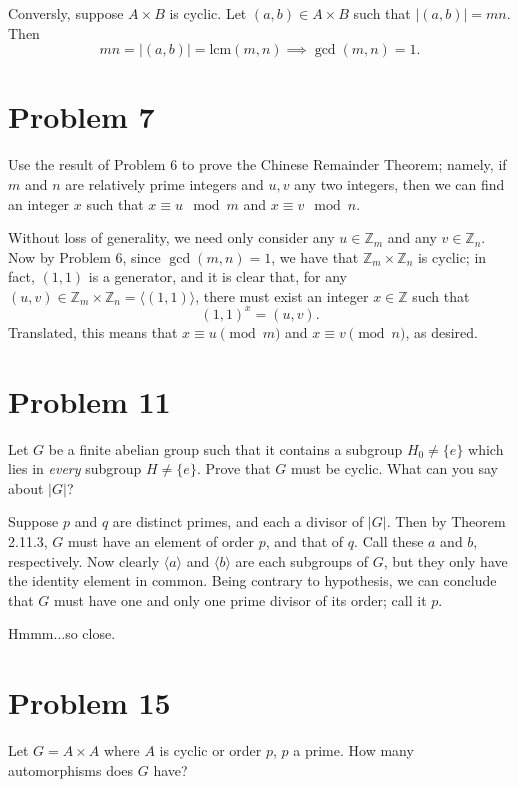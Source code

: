 \documentclass[12pt]{article}
\newcommand{\lcm}{\mbox{lcm}}
\newcommand{\Z}{\mathbb{Z}}
\begin{document}
Conversly, suppose $A\times B$ is cyclic.  Let $(a,b)\in A\times B$ such that $|(a,b)|=mn$.
Then
\begin{equation*}
mn=|(a,b)|=\lcm(m,n)\implies\gcd(m,n)=1.
\end{equation*}

\section*{Problem 7}

Use the result of Problem 6 to prove the Chinese Remainder Theorem; namely, if $m$ and $n$
are relatively prime integers and $u,v$ any two integers, then we can find an integer $x$ such that
$x\equiv u\mod m$ and $x\equiv v\mod n$.

Without loss of generality, we need only consider any $u\in\Z_m$ and any $v\in\Z_n$.
Now by Problem 6, since $\gcd(m,n)=1$, we have that $\Z_m\times\Z_n$ is cyclic;
in fact, $(1,1)$ is a generator, and it is clear that, for any $(u,v)\in\Z_m\times\Z_n=\langle(1,1)\rangle$,
there must exist an integer $x\in\Z$ such that
\begin{equation*}
(1,1)^x=(u,v).
\end{equation*}
Translated, this means that $x\equiv u\pmod{m}$ and $x\equiv v\pmod{n}$, as desired.

\section*{Problem 11}

Let $G$ be a finite abelian group such that it contains a subgroup $H_0\neq\{e\}$ which lies
in {\it every} subgroup $H\neq\{e\}$.  Prove that $G$ must be cyclic.  What can you say about $|G|$?

Suppose $p$ and $q$ are distinct primes, and each a divisor of $|G|$.  Then by Theorem 2.11.3,
$G$ must have an element of order $p$, and that of $q$.  Call these $a$ and $b$, respectively.
Now clearly $\langle a\rangle$ and $\langle b\rangle$ are each subgroups of $G$, but they only have
the identity element in common.  Being contrary to hypothesis, we can conclude that $G$ must
have one and only one prime divisor of its order; call it $p$.

Hmmm...so close.

\section*{Problem 15}

Let $G=A\times A$ where $A$ is cyclic or order $p$, $p$ a prime.  How many automorphisms does $G$ have?
\end{document}
